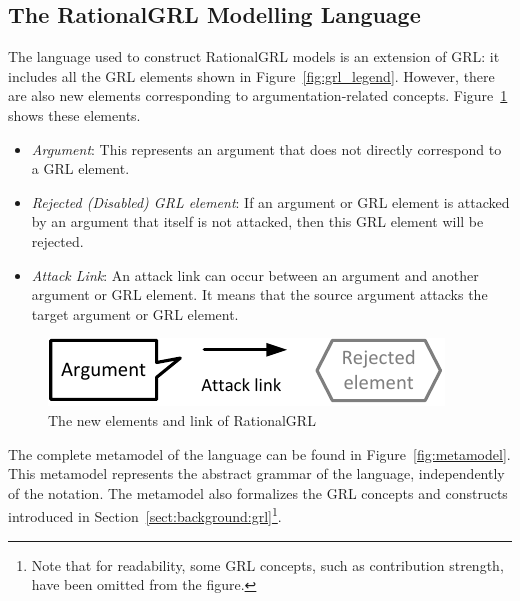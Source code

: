 \subsection{The RationalGRL Modelling Language}
\label{sect:overview:lang}\label{sect:metamodel}
The language used to construct RationalGRL models is an extension of GRL: it includes all the GRL elements shown in Figure~\ref{fig:grl_legend}. However, there are also new elements corresponding to argumentation-related concepts. Figure~\ref{fig:rationalgrllegend} shows these elements. 
\begin{itemize}
\item \emph{Argument}: This represents an argument that does not directly correspond to a GRL element.  
\item \emph{Rejected (Disabled) GRL element}: If an argument or GRL element is attacked by an argument that itself is not attacked, then this GRL element will be rejected. 
\item \emph{Attack Link}: An attack link can occur between an argument and another argument or GRL element. It means that the source argument attacks the target argument or GRL element.
\end{itemize} 

\begin{figure}[t]
\centering
\includegraphics{img/legend.pdf}
\caption{The new elements and link of RationalGRL}
\label{fig:rationalgrllegend}
\end{figure}

The complete metamodel of the language can be found in Figure~\ref{fig:metamodel}. This metamodel represents the abstract grammar of the language, independently of the notation. The metamodel also formalizes the GRL concepts and constructs introduced in Section~\ref{sect:background:grl}\footnote{Note that for readability, some GRL concepts, such as contribution strength, have been omitted from the figure.}.

